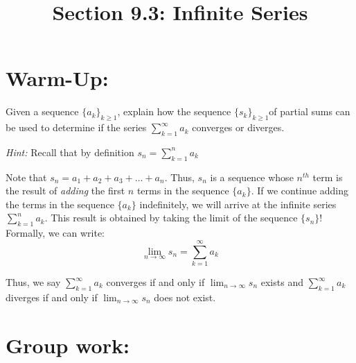 \documentclass[noinstructornotes]{ximera}
\title{Section 9.3: Infinite Series}
\begin{document}
\begin{abstract}		\end{abstract}
\maketitle

\section{Warm-Up:}
\begin{problem}
Given a sequence $\{a_k\}_{k\geq1}$, explain how the sequence $\{s_k\}_{k\geq1}$of partial sums can be used to determine if the series $\displaystyle \sum_{k=1}^{\infty} a_k$ converges or diverges. 

\vspace{3mm}
\emph{Hint:} Recall that by definition $\displaystyle s_n = \sum_{k=1}^{n} a_k$
\end{problem}

\begin{freeResponse}
Note that $s_n = a_1+a_2+a_3+ \ldots + a_n$.  Thus, $s_n$ is a sequence whose $n^{th}$ term is the result of \emph{adding} the first $n$ terms in the sequence $\{a_k\}$.  If we continue adding the terms in the sequence $\{ a_k \}$ indefinitely, we will arrive at the infinite series $ \sum_{k=1}^{n} a_k$.  This result is obtained by taking the limit of the sequence $\{s_n\}$!  Formally, we can write: $$\lim_{n \rightarrow \infty} s_n = \sum_{k=1}^{\infty} a_k$$

Thus, we say $\displaystyle \sum_{k=1}^{\infty} a_k$ converges if and only if $\lim_{n \rightarrow \infty} s_n$ exists and $\displaystyle \sum_{k=1}^{\infty} a_k$ diverges if and only if $\lim_{n \rightarrow \infty} s_n$ does not exist.
\end{freeResponse}



\section{Group work:}
\end{document}
